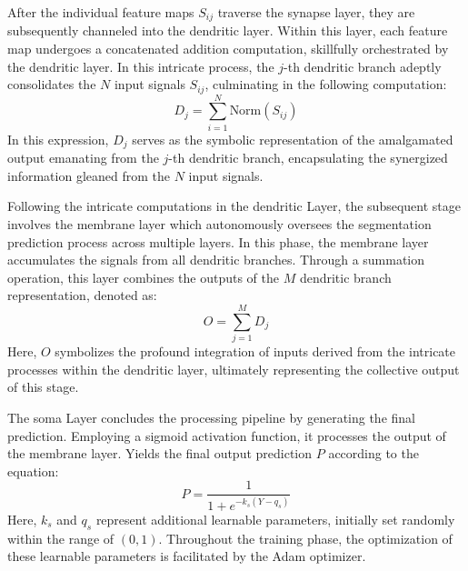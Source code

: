 \documentclass[review]{elsarticle}
\begin{document}
	After the individual feature maps $S_{ij}$ traverse the synapse layer, they are subsequently channeled into the dendritic layer. Within this layer, each feature map undergoes a concatenated addition computation, skillfully orchestrated by the dendritic layer. In this intricate process, the $j$-th dendritic branch adeptly consolidates the $N$ input signals $S_{ij}$, culminating in the following computation:
	\begin{equation}
		D_j = \sum_{i=1}^{N} \text{Norm}(S_{ij})
	\end{equation}
	In this expression, $D_j$ serves as the symbolic representation of the amalgamated output emanating from the $j$-th dendritic branch, encapsulating the synergized information gleaned from the $N$ input signals.

	Following the intricate computations in the dendritic Layer, the subsequent stage involves the membrane layer which autonomously oversees the segmentation prediction process across multiple layers. In this phase, the membrane layer accumulates the signals from all dendritic branches. Through a summation operation, this layer combines the outputs of the $M$ dendritic branch representation, denoted as:
	\begin{equation}
		O = \sum_{j=1}^{M} D_j
	\end{equation}
	Here, $O$ symbolizes the profound integration of inputs derived from the intricate processes within the dendritic layer, ultimately representing the collective output of this stage.

	The soma Layer concludes the processing pipeline by generating the final prediction. Employing a sigmoid activation function, it processes the output of the membrane layer. Yields the final output prediction $P$ according to the equation:
	\begin{equation}
		P = \frac{1}{1 + e^{-k_s(Y - q_s)}}
	\end{equation}
	Here, $k_s$ and $q_s$ represent additional learnable parameters, initially set randomly within the range of $(0, 1)$. Throughout the training phase, the optimization of these learnable parameters is facilitated by the Adam optimizer.
\end{document}
